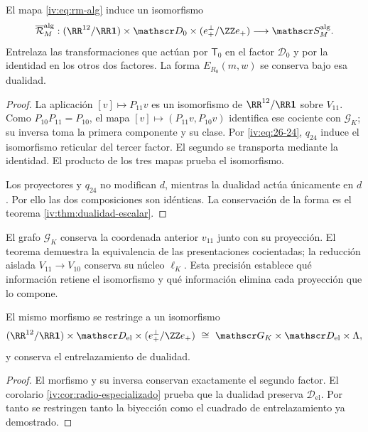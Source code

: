 \begin{theorem}
\label{iv:thm:pantallas-isomorfas}
\label{thm:k-pantallas-coordinadas}
El mapa \eqref{iv:eq:rm-alg} induce un isomorfismo
\[
 \overline{\mathcal R}_M^{\mathrm{alg}}:
 (\RR^{12}/\RR\mathbf1)\times\mathscr D_0
 \times(e_+^\perp/\ZZ e_+)
 \longrightarrow\mathscr S_M^{\mathrm{alg}}.
\]
Entrelaza las transformaciones que actúan por \(\mathsf T_0\)
en el factor \(\mathscr D_0\) y por la identidad en los
otros dos factores. La forma \(E_{R_0}(m,w)\) se conserva
bajo esa dualidad.
\end{theorem}
\begin{proof}
La aplicación \([v]\mapsto P_{11}v\) es un isomorfismo
de \(\RR^{12}/\RR\mathbf1\) sobre \(V_{11}\).
Como \(P_{10}P_{11}=P_{10}\), el mapa
\([v]\mapsto(P_{11}v,P_{10}v)\) identifica ese cociente
con \(\mathscr G_K\); su inversa toma la primera componente
y su clase. Por \eqref{iv:eq:26-24}, \(q_{24}\) induce el
isomorfismo reticular del tercer factor. El segundo se
transporta mediante la identidad. El producto de los tres
mapas prueba el isomorfismo.

Los proyectores y \(q_{24}\) no modifican \(d\), mientras
la dualidad actúa únicamente en \(d\). Por ello las dos
composiciones son idénticas. La conservación de la forma
es el teorema \ref{iv:thm:dualidad-escalar}.
\end{proof}

El grafo \(\mathscr G_K\) conserva la coordenada anterior
\(v_{11}\) junto con su proyección. El teorema demuestra
la equivalencia de las presentaciones cocientadas; la reducción
aislada \(V_{11}\to V_{10}\) conserva su núcleo
\(\ell_K\). Esta precisión establece qué información
retiene el isomorfismo y qué información elimina cada
proyección que lo compone.

\begin{corollary}
El mismo morfismo se restringe a un isomorfismo
\[
 (\RR^{12}/\RR\mathbf1)\times\mathscr D_{\mathrm{el}}
 \times(e_+^\perp/\ZZ e_+)
 \ \cong\ \mathscr G_K\times\mathscr D_{\mathrm{el}}\times\Lambda,
\]
y conserva el entrelazamiento de dualidad.
\end{corollary}
\begin{proof}
El morfismo y su inversa conservan exactamente el segundo factor.
El corolario \ref{iv:cor:radio-especializado} prueba que la dualidad
preserva \(\mathscr D_{\mathrm{el}}\). Por tanto se restringen
tanto la biyección como el cuadrado de entrelazamiento ya demostrado.
\end{proof}

